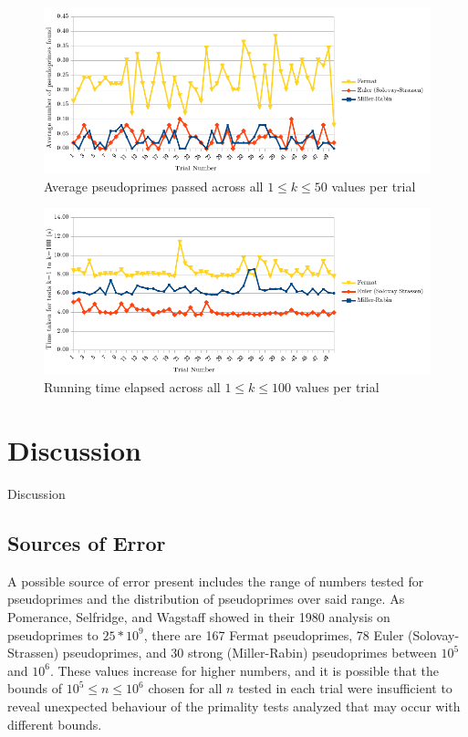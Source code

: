 \documentclass{article}
\begin{document}
\FloatBarrier
\begin{figure}[h!]
\caption{Average pseudoprimes passed across all $1 \leq k \leq 50$ values per trial}
\label{fig:pprimes_v_trial}
\centering
\includegraphics[width=\textwidth]{pprimes_v_trial}
\end{figure}
\FloatBarrier

\FloatBarrier
\begin{figure}[h!]
\caption{Running time elapsed across all $1 \leq k \leq 100$ values per trial}
\label{fig:time_v_trial}
\centering
\includegraphics[width=\textwidth]{time_v_trial}
\end{figure}
\FloatBarrier


\section{Discussion}
Discussion

\subsection{Sources of Error}
\label{soe}
A possible source of error present includes the range of numbers tested for pseudoprimes and the distribution of pseudoprimes over said range. %
As Pomerance, Selfridge, and Wagstaff showed in their 1980 analysis on pseudoprimes to $25 * 10^9$, there are 167 Fermat pseudoprimes, 78 Euler (Solovay-Strassen) pseudoprimes, and 30 strong (Miller-Rabin) pseudoprimes between $10^5$ and $10^6$. These values increase for higher numbers, and it is possible that the bounds of $10^5 \leq n \leq 10^6$ chosen for all $n$ tested in each trial were insufficient to reveal unexpected behaviour of the primality tests analyzed that may occur with different bounds.
\end{document}

